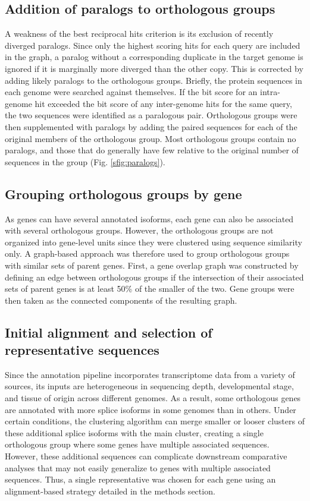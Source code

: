 \documentclass[10pt,letterpaper]{article}
\begin{document}
\subsection*{Addition of paralogs to orthologous groups}
A weakness of the best reciprocal hits criterion is its exclusion of recently diverged paralogs. Since only the highest scoring hits for each query are included in the graph, a paralog without a corresponding duplicate in the target genome is ignored if it is marginally more diverged than the other copy. This is corrected by adding likely paralogs to the orthologous groups. Briefly, the protein sequences in each genome were searched against themselves. If the bit score for an intra-genome hit exceeded the bit score of any inter-genome hits for the same query, the two sequences were identified as a paralogous pair. Orthologous groups were then supplemented with paralogs by adding the paired sequences for each of the original members of the orthologous group. Most orthologous groups contain no paralogs, and those that do generally have few relative to the original number of sequences in the group (Fig. \ref{sfig:paralogs}).

\subsection*{Grouping orthologous groups by gene}
As genes can have several annotated isoforms, each gene can also be associated with several orthologous groups. However, the orthologous groups are not organized into gene-level units since they were clustered using sequence similarity only. A graph-based approach was therefore used to group orthologous groups with similar sets of parent genes. First, a gene overlap graph was constructed by defining an edge between orthologous groups if the intersection of their associated sets of parent genes is at least 50\% of the smaller of the two. Gene groups were then taken as the connected components of the resulting graph.

\subsection*{Initial alignment and selection of representative sequences}
Since the annotation pipeline incorporates transcriptome data from a variety of sources, its inputs are heterogeneous in sequencing depth, developmental stage, and tissue of origin across different genomes. As a result, some orthologous genes are annotated with more splice isoforms in some genomes than in others. Under certain conditions, the clustering algorithm can merge smaller or looser clusters of these additional splice isoforms with the main cluster, creating a single orthologous group where some genes have multiple associated sequences. However, these additional sequences can complicate downstream comparative analyses that may not easily generalize to genes with multiple associated sequences. Thus, a single representative was chosen for each gene using an alignment-based strategy detailed in the methods section.
\end{document}
